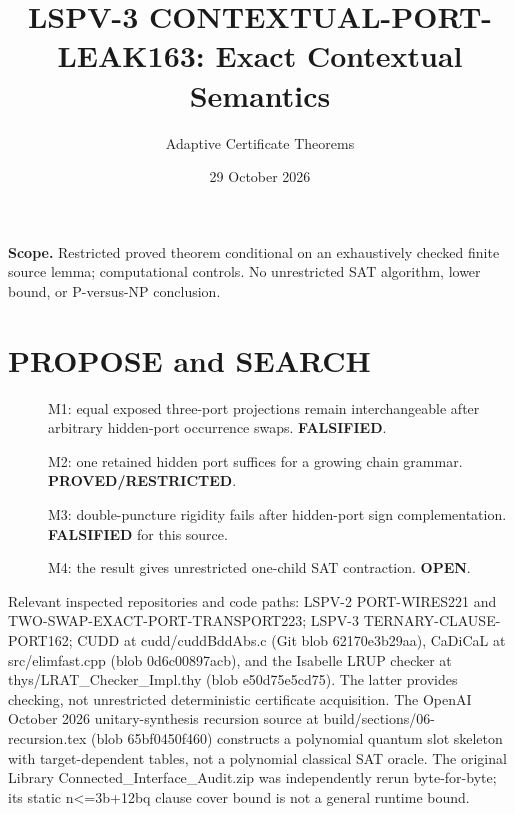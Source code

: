\documentclass[11pt]{article}
\title{LSPV-3 CONTEXTUAL-PORT-LEAK163: Exact Contextual Semantics}
\author{Adaptive Certificate Theorems}
\date{29 October 2026}
\begin{document}
\maketitle
\noindent\textbf{Scope.} Restricted proved theorem conditional on an exhaustively checked finite source lemma; computational controls. No unrestricted SAT algorithm, lower bound, or P-versus-NP conclusion.
\section{PROPOSE and SEARCH}
\begin{description}
\item[] M1: equal exposed three-port projections remain interchangeable after arbitrary hidden-port occurrence swaps. \textbf{FALSIFIED}.
\item[] M2: one retained hidden port suffices for a growing chain grammar. \textbf{PROVED/RESTRICTED}.
\item[] M3: double-puncture rigidity fails after hidden-port sign complementation. \textbf{FALSIFIED} for this source.
\item[] M4: the result gives unrestricted one-child SAT contraction. \textbf{OPEN}.
\end{description}
Relevant inspected repositories and code paths: LSPV-2 PORT-WIRES221 and TWO-SWAP-EXACT-PORT-TRANSPORT223; LSPV-3 TERNARY-CLAUSE-PORT162; CUDD at cudd/cuddBddAbs.c (Git blob 62170e3b29aa), CaDiCaL at src/elimfast.cpp (blob 0d6c00897acb), and the Isabelle LRUP checker at thys/LRAT_Checker_Impl.thy (blob e50d75e5cd75). The latter provides checking, not unrestricted deterministic certificate acquisition. The OpenAI October 2026 unitary-synthesis recursion source at build/sections/06-recursion.tex (blob 65bf0450f460) constructs a polynomial quantum slot skeleton with target-dependent tables, not a polynomial classical SAT oracle. The original Library Connected_Interface_Audit.zip was independently rerun byte-for-byte; its static n<=3b+12bq clause cover bound is not a general runtime bound.
\end{document}
